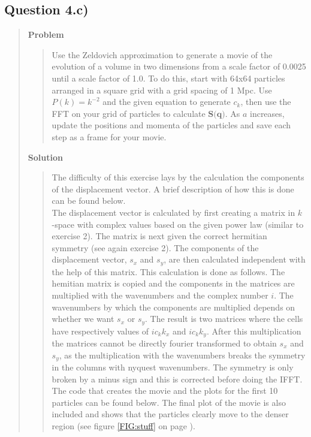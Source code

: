 
\subsection*{\textbf{Question 4.c)}}
\begin{quote}

\textbf{Problem}
\begin{quote} 
Use the Zeldovich approximation to generate a movie of the evolution of a volume in two dimensions
from a scale factor of 0.0025 until a scale factor of 1.0. To do this, start with 64x64 particles arranged in a square grid with a grid spacing of 1 Mpc. Use $P(k) = k^{-2}$ and the given equation to generate $c_k$, then use the FFT on your grid of particles to calculate $\textbf{S(q)}$. As $a$ increases, update the positions and momenta of the particles and save each step as a frame for your movie. 
\end{quote}

\textbf{Solution} 
\begin{quote}
The difficulty of this exercise lays by the calculation the components of the displacement vector. A brief description of how this is done can be found below.
\\

The displacement vector is calculated by first creating a matrix in $k$ -space with complex values based on the given power law (similar to exercise 2). The matrix is next given the correct hermitian symmetry (see again exercise 2). The components of the displacement vector, $s_x$ and $s_y$, are then calculated independent with the help of this matrix.  This calculation is done as follows. The hemitian matrix is copied and the components in the matrices are multiplied with the wavenumbers and the complex number $i$. The wavenumbers by which the components are multiplied depends on whether we want $s_x$ or $s_y$. The result is two matrices where the cells have respectively values of $ic_k k_x$ and $ic_k k_y$. After this multiplication the matrices cannot be directly fourier transformed to obtain $s_x$ and $s_y$, as the multiplication with the wavenumbers breaks the symmetry in the columns with nyquest wavenumbers. The symmetry is only broken by a minus sign and this is corrected before doing the IFFT. 
\\
The code that creates the movie and the plots for the first 10 particles can be found below. The final plot of the movie is also included and shows that the particles clearly move to the denser region (see figure \ref{FIG:stuff} on page \pageref{FIG:stuff}).


\end{quote}
\end{quote}
